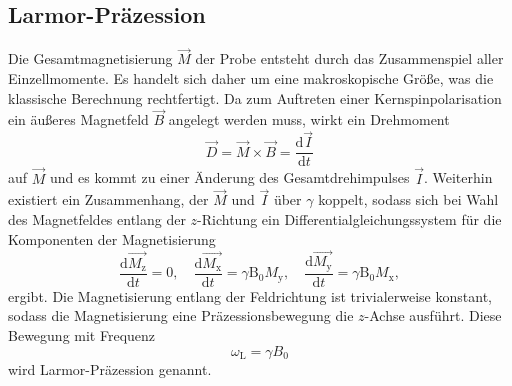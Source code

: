 \subsection{Larmor-Präzession}
Die Gesamtmagnetisierung $\vec{M}$ der Probe entsteht durch das Zusammenspiel aller
Einzellmomente. Es handelt sich daher um eine makroskopische Größe, was die klassische
Berechnung rechtfertigt.
Da zum Auftreten einer Kernspinpolarisation ein äußeres Magnetfeld $\vec{B}$ angelegt werden muss,
wirkt ein Drehmoment
\begin{equation}
		\vec{D} = \vec{M} \times \vec{B} = \frac{\text{d} \vec{I}}{\text{d}t}
\end{equation}
auf $\vec{M}$ und es kommt zu einer Änderung des Gesamtdrehimpulses $\vec{I}$.
Weiterhin existiert ein Zusammenhang, der $\vec{M}$ und $\vec{I}$ über $\gamma$
koppelt, sodass sich bei Wahl des Magnetfeldes entlang der $z$-Richtung ein Differentialgleichungssystem
für die Komponenten der Magnetisierung
\begin{equation}
		\frac{\text{d} \vec{M_\text{z}}}{\text{d}t} = 0 ,  \hspace{1em}
		\frac{\text{d} \vec{M_\text{x}}}{\text{d}t} = \gamma \text{B}_0
		M_\text{y}, \hspace{1em}
		\frac{\text{d} \vec{M_\text{y}}}{\text{d}t} = \gamma \text{B}_0
		M_\text{x},
\end{equation}
ergibt.
Die Magnetisierung entlang der Feldrichtung ist trivialerweise konstant, sodass
die Magnetisierung eine Präzessionsbewegung die $z$-Achse
ausführt.
Diese Bewegung mit Frequenz
\begin{equation}
  \omega_{\text{L}} = \gamma B_{0}
\end{equation}
wird Larmor-Präzession genannt.

